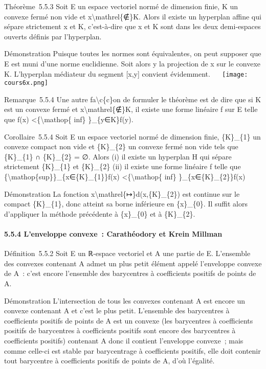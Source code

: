 \documentclass[]{article}
\begin{document}
Théorème~5.5.3 Soit E un espace vectoriel normé de dimension finie, K un
convexe fermé non vide et x\textbackslash{}mathrel\{∉\}K. Alors il
existe un hyperplan affine qui sépare strictement x et K, c'est-à-dire
que x et K sont dans les deux demi-espaces ouverts définis par
l'hyperplan.

Démonstration Puisque toutes les normes sont équivalentes, on peut
supposer que E est muni d'une norme euclidienne. Soit alors y la
projection de x sur le convexe K. L'hyperplan médiateur du segment
{[}x,y{]} convient évidemment. ~~ \texttt{[image: cours6x.png]}

Remarque~5.5.4 Une autre fa\textbackslash{}c\{c\}on de formuler le
théorème est de dire que si K est un convexe fermé et
x\textbackslash{}mathrel\{∉\}K, il existe une forme linéaire f sur E
telle que f(x) \textless{}\{\textbackslash{}mathop\{ inf\}
\}\_\{y∈K\}f(y).

Corollaire~5.5.4 Soit E un espace vectoriel normé de dimension finie,
\{K\}\_\{1\} un convexe compact non vide et \{K\}\_\{2\} un convexe
fermé non vide tels que \{K\}\_\{1\} ∩ \{K\}\_\{2\} = ∅. Alors (i) il
existe un hyperplan H qui sépare strictement \{K\}\_\{1\} et
\{K\}\_\{2\} (ii) il existe une forme linéaire f telle que
\{\textbackslash{}mathop\{sup\}\}\_\{x∈\{K\}\_\{1\}\}f(x)
\textless{}\{\textbackslash{}mathop\{ inf\} \}\_\{x∈\{K\}\_\{2\}\}f(x)

Démonstration La fonction x\textbackslash{}mathrel\{↦\}d(x,\{K\}\_\{2\})
est continue sur le compact \{K\}\_\{1\}, donc atteint sa borne
inférieure en \{x\}\_\{0\}. Il suffit alors d'appliquer la méthode
précédente à \{x\}\_\{0\} et à \{K\}\_\{2\}.

\paragraph{5.5.4 L'enveloppe convexe~: Carathéodory et Krein Millman}

Définition~5.5.2 Soit E un ℝ-espace vectoriel et A une partie de E.
L'ensemble des convexes contenant A admet un plus petit élément appelé
l'enveloppe convexe de A~: c'est encore l'ensemble des barycentres à
coefficients positifs de points de A.

Démonstration L'intersection de tous les convexes contenant A est encore
un convexe contenant A et c'est le plus petit. L'ensemble des
barycentres à coefficients positifs de points de A est un convexe (les
barycentres à coefficients positifs de barycentres à coefficients
positifs sont encore des barycentres à coefficients positifs) contenant
A donc il contient l'enveloppe convexe~; mais comme celle-ci est stable
par barycentrage à coefficients positifs, elle doit contenir tout
barycentre à coefficients positifs de points de A, d'où l'égalité.
\end{document}
